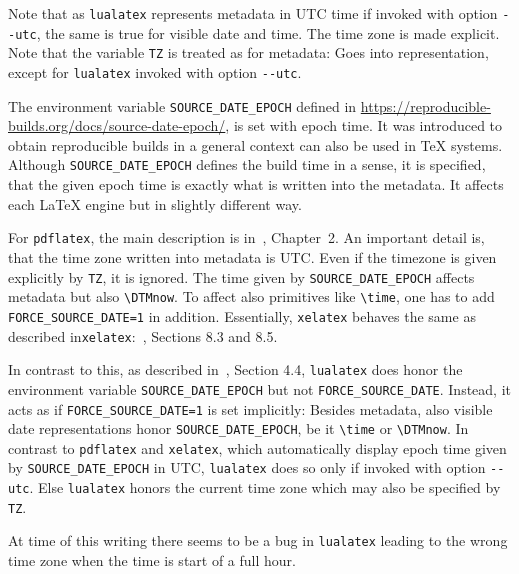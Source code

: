 \documentclass[a4paper, english]{article}%
\newcommand{\pdflatex}{\texttt{pdflatex}}
\newcommand{\lualatex}{\texttt{lualatex}}
\newcommand{\xelatex}{\texttt{xelatex}}
\newcommand{\cmd}[1]{\texttt{\textbackslash#1}}
\begin{document}
Note that as \lualatex{} represents metadata in UTC time if invoked with option \texttt{-{}-utc}, 
the same is true for visible date and time. 
The time zone is made explicit. 
Note that the variable \texttt{TZ} is treated as for metadata: 
Goes into representation, except for \lualatex{} invoked with option \texttt{-{}-utc}. 
\medskip








The environment variable \texttt{SOURCE\_DATE\_EPOCH} 
defined in \url{https://reproducible-builds.org/docs/source-date-epoch/}, 
is set with epoch time. 
It was introduced to obtain reproducible builds in a general context 
can also be used in \TeX{} systems. 
Although \texttt{SOURCE\_DATE\_EPOCH} defines the build time in a sense, 
it is specified, that the given epoch time is exactly what is written into the metadata. 
It affects each \LaTeX{} engine but in slightly different way. 

For \pdflatex, the main description is in~\cite{PdfTexUsr24}, Chapter~2.
An important detail is, that the time zone written into metadata is UTC. 
Even if the timezone is given explicitly by \texttt{TZ}, it is ignored. 
The time given by \texttt{SOURCE\_DATE\_EPOCH} affects metadata but also \cmd{DTMnow}. 
To affect also primitives like \cmd{time}, 
one has to add \texttt{FORCE\_SOURCE\_DATE=1} in addition. 
Essentially, \xelatex{} behaves the same as described in\xelatex:~\cite{XeTexRef24}, Sections 8.3 and 8.5. 

In contrast to this, as described in~\cite{LuaTexRef24}, Section 4.4, 
\lualatex{} does honor the environment variable \texttt{SOURCE\_DATE\_EPOCH} but not \texttt{FORCE\_SOURCE\_DATE}. 
Instead, it acts as if \texttt{FORCE\_SOURCE\_DATE=1} is set implicitly: 
Besides metadata, also visible date representations honor \texttt{SOURCE\_DATE\_EPOCH}, 
be it \cmd{time} or \cmd{DTMnow}. 
In contrast to \pdflatex{} and \xelatex, 
which automatically display epoch time given by \texttt{SOURCE\_DATE\_EPOCH} in UTC, 
\lualatex{} does so only if invoked with option \texttt{-{}-utc}. 
Else \lualatex{} honors the current time zone 
which may also be specified by \texttt{TZ}. 








At time of this writing there seems to be a bug in \lualatex{} 
leading to the wrong time zone 
when the time is start of a full hour. 
\end{document}
